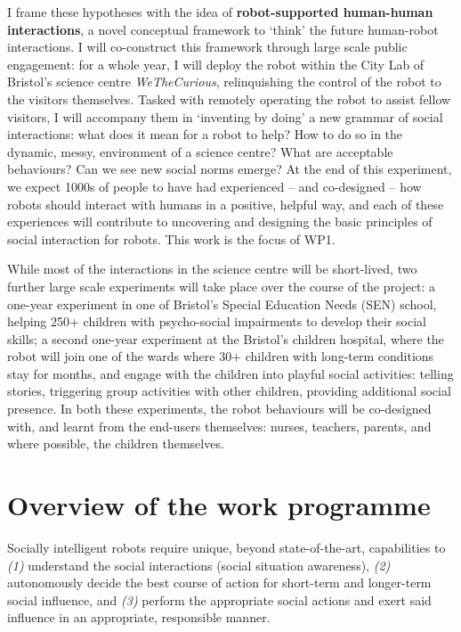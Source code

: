 I frame these hypotheses with the idea of \textbf{robot-supported human-human
interactions}, a novel conceptual framework to `think' the future human-robot
interactions. I will co-construct this framework through large scale public
engagement: for a whole year, I will deploy the \project robot within the City
Lab of Bristol's science centre \emph{WeTheCurious}, relinquishing the control
of the robot to the visitors themselves. Tasked with remotely operating the
robot to assist fellow visitors, I will accompany them in `inventing by doing' a
new grammar of social interactions: what does it mean for a robot to help? How
to do so in the dynamic, messy, environment of a science centre? What are acceptable
behaviours? Can we see new social norms emerge? At the end of this experiment,
we expect 1000s of people to have had experienced -- and co-designed -- how
robots should interact with humans in a positive, helpful way, and each of these
experiences will contribute to uncovering and designing the basic principles of
social interaction for robots. This work is the focus of WP1.

While most of the interactions in the science centre will be short-lived, two further
large scale experiments will take place over the course of the project: a
one-year experiment in one of Bristol's Special Education Needs (SEN) school,
helping 250+ children with psycho-social impairments to develop their social
skills; a second one-year experiment at the Bristol's children hospital, where
the robot will join one of the wards where 30+ children with long-term conditions
stay for months, and engage with the children into playful social activities: telling
stories, triggering group activities with other children, providing additional
social presence. In both these experiments, the robot behaviours will be
co-designed with, and learnt from the end-users themselves: nurses, teachers,
parents, and where possible, the children themselves.


\section{Overview of the \project work programme}

Socially intelligent robots require unique, beyond state-of-the-art,
capabilities to \emph{(1)} understand the social interactions (social
situation awareness), \emph{(2)} autonomously decide the best course of action for
short-term and longer-term social influence, and \emph{(3)} perform the
appropriate social actions and exert said influence in an appropriate,
responsible manner.


